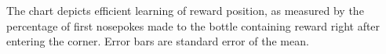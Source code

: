 The chart depicts efficient learning of reward position, as measured by the
percentage of first nosepokes made to the bottle containing reward right after
entering the corner.
Error bars are standard error of the mean.
